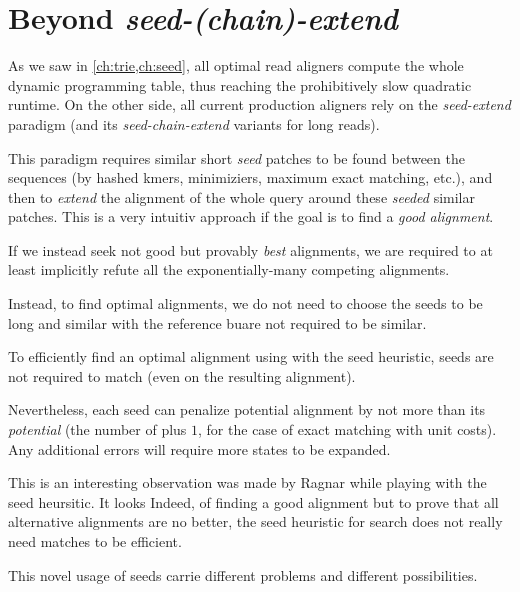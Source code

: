 \section{Beyond \emph{seed-(chain)-extend}}

As we saw in \cref{ch:trie,ch:seed}, all optimal read aligners compute the whole
dynamic programming table, thus reaching the prohibitively slow quadratic
runtime. On the other side, all current production aligners rely on the
\emph{seed-extend} paradigm (and its \emph{seed-chain-extend} variants for long
reads).

This paradigm requires similar short \emph{seed} patches to be found
between the sequences (\eg by hashed kmers, minimiziers, maximum exact matching,
etc.), and then to \emph{extend} the alignment of the whole query around these
\emph{seeded} similar patches. This is a very intuitiv approach if the goal is
to find a \emph{good alignment}.

If we instead seek not good but provably \emph{best} alignments, we are required
to at least implicitly refute all the exponentially-many competing alignments.

Instead, to find optimal alignments, we do not need to choose the seeds to be
long and similar with the reference buare not required to be similar.

\begin{observation}
    To efficiently find an optimal alignment using \A with the seed heuristic,
    seeds are not required to match (even on the resulting alignment).
\end{observation}

Nevertheless, each seed can penalize potential alignment by not more than its
\emph{potential} (\ie the number of plus $1$, for the case of exact matching
with unit costs). Any additional errors will require more states to be expanded.

This is an interesting observation was made by Ragnar while playing with the
seed heursitic. It looks Indeed, of finding a good alignment but to prove that all
alternative alignments are no better, the seed heuristic for \A search does not
really need matches to be efficient.

This novel usage of seeds carrie different problems and different possibilities.